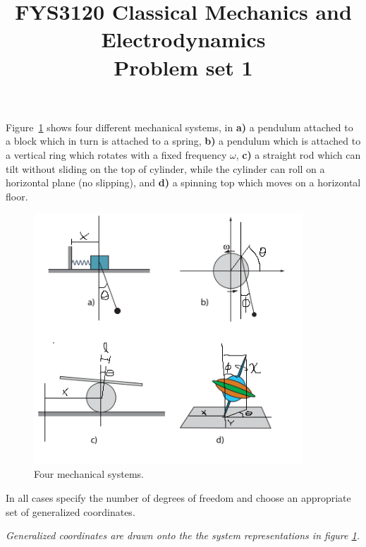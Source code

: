\documentclass[11pt,a4paper]{report}
\title{FYS3120 Classical Mechanics and Electrodynamics\\ 
\vspace{15mm}Problem set 1}
\newcounter{excount}[chapter]
\newenvironment{exercise}[1][]{\addtocounter{excount}{1} \noindent {\bf Problem
    \arabic{excount} \ \ #1}\hspace{2mm}}{\vspace{4mm}}
\begin{document}
\maketitle

\begin{exercise}
Figure~\ref{fig:gc} shows four different mechanical systems, in {\bf a)} a pendulum attached to a block which in turn is attached to a spring, {\bf b)} a pendulum which is attached to a vertical ring which rotates with a fixed frequency $\omega$, {\bf c)} a straight rod which can tilt without sliding on the top of cylinder, while the cylinder can roll on a horizontal plane (no slipping), and {\bf d)} a spinning top which moves on a horizontal floor.

\begin{figure}[h!]
\begin{center}
\includegraphics[width=0.9\textwidth]{1tegnt.png}
\end{center}
\caption{Four mechanical systems.}
\label{fig:gc}
\end{figure}

In all cases specify the number of degrees of freedom and choose an appropriate set of generalized coordinates. \newline

\textit{Generalized coordinates are drawn onto the the system representations in figure \ref{fig:gc}.}



\end{exercise}
\end{document}
